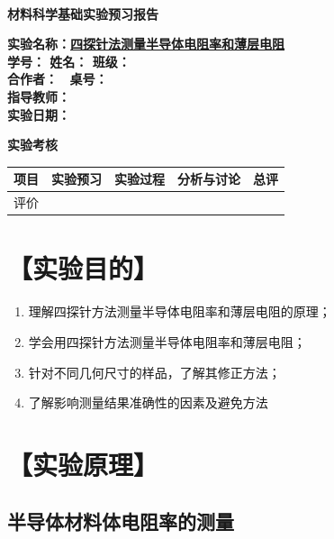 \documentclass[a4paper,utf8]{article}
\begin{document}
\begin{center}
    {\mbox{}\\[7em]\bfseries\songti%
    材料科学基础实验预习报告}\\[34mm]
    {\bfseries\songti
    实验名称：\uline{\hfill\mbox{四探针法测量半导体电阻率和薄层电阻}\hfill} \\[2.9mm]
    学\quad 号：\uline{}\hfill
    姓\quad 名：\uline{}\hfill
    班\quad 级：\uline{} \\[2.9mm]
    合作者：\uline{\makebox[25mm]{}}\enspace~
    桌\quad 号：\uline{\makebox[25mm]{}}\hfill\mbox{}\\[2.9mm]
    指导教师：\uline{}\hfill\mbox{} \\[2.9mm]
    实验日期：\uline{\makebox[30mm]{}}\hfill\mbox{} \\[58.7mm]
    {\bfseries\songti
    实验考核\\[3mm]
    \extrarowheight=3mm
    \begin{tabularx}{150mm}{|X|X|X|X|X|}\hline
        \hfil 项目 \hfil  & \hfil 实验预习 \hfil & \hfil 实验过程 \hfil & \hfil 分析与讨论 \hfil & \hfil 总评 \hfil \\[3mm] \hline
        \hfil 评价 \hfil &  &  &  &  \\[3mm] \hline
    \end{tabularx}
    }
    }
\end{center}
\newpage
\section*{【实验目的】}
    \begin{enumerate}
        \item 理解四探针方法测量半导体电阻率和薄层电阻的原理；
        \item 学会用四探针方法测量半导体电阻率和薄层电阻；
        \item 针对不同几何尺寸的样品，了解其修正方法；
        \item 了解影响测量结果准确性的因素及避免方法
    \end{enumerate}
\section*{【实验原理】}%
    \subsection{半导体材料体电阻率的测量}
\end{document}
